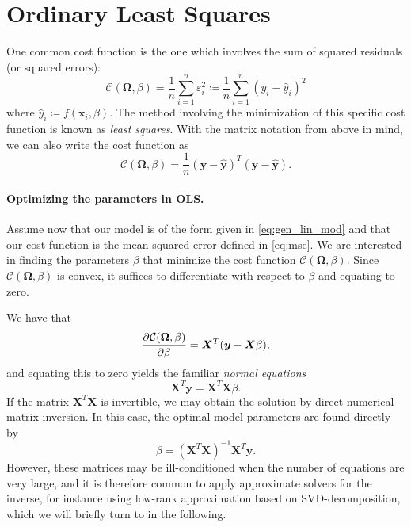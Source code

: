 \documentclass[article, a4paper, oneside, 12pt]{memoir}
\newcommand{\x}{\bm{x}}
\newcommand{\X}{\bm{X}}
\newcommand{\y}{\bm{y}}
\newcommand{\data}{\bm{\Omega}}
\newcommand{\cost}{\mathcal{C}}
\begin{document}
  \section{Ordinary Least Squares}
  
  One common cost function is the one which involves the sum of squared
  residuals (or squared errors):
  \begin{equation}
    \label{eq:mse}
    \cost(\data, \beta) = \frac{1}{n}\sum_{i = 1}^n \varepsilon_i^2 \coloneqq \frac{1}{n}\sum_{i=1}^n (y_i - \hat{y}_i)^2
  \end{equation}
  where \( \hat{y}_i \coloneqq f(\x_i, \beta) \). The method involving the
  minimization of this specific cost function is known as \emph{least squares}.
  With the matrix notation from above in mind, we can also write the cost
  function as
  \begin{equation}
    \cost(\data, \beta) = \frac{1}{n} (\y - \hat{\y})^T (\y - \hat{\y}).
  \end{equation}

  

  \paragraph{Optimizing the parameters in OLS.}
  
  Assume now that our model is of the form given in \cref{eq:gen_lin_mod} and
  that our cost function is the mean squared error defined in \cref{eq:mse}. We
  are interested in finding the parameters \( \beta \) that minimize the cost
  function \( \cost(\data, \beta) \). Since \( \cost(\data, \beta) \) is
  convex, it suffices to differentiate with respect to \( \beta \) and equating
  to zero. 
  
  We have that
  \begin{align}
    \dpd{\cost(\data, \beta)}{\beta} = \X^T(\y - \X\beta), 
  \end{align}
  and equating this to zero yields the familiar \emph{normal equations}
  \begin{equation}
    \X^T \y = \X^T\X\beta.
  \end{equation}
  If the matrix \( \X^T\X \) is invertible, we may obtain the solution by
  direct numerical matrix inversion. In this case, the optimal model parameters
  are found directly by
  \begin{equation}
    \label{eq:optimal}
    \beta = (\X^T\X)^{-1}\X^T\y.
  \end{equation}
  However, these matrices may be ill-conditioned when the number of equations
  are very large, and it is therefore common to apply approximate solvers for
  the inverse, for instance using low-rank approximation based on
  \textsc{SVD}-decomposition, which we will briefly turn to in the following.
\end{document}
